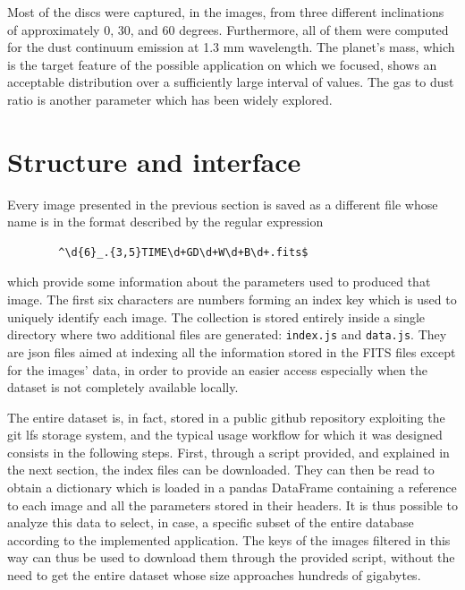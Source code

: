 \documentclass[a4paper,10pt]{report}
\begin{document}
Most of the discs were captured, in the images, from three different inclinations of approximately
0, 30, and 60 degrees. Furthermore, all of them were computed for the dust continuum emission 
at 1.3 mm wavelength.
The planet's mass, which is the target feature of the possible application on which we focused, shows an acceptable distribution over
a sufficiently large interval of values. The gas to dust ratio is another parameter which has been widely explored.

\section{Structure and interface}

Every image presented in the previous section is saved as a different file whose name is in the format 
described by the regular expression 
\begin{center}
    \begin{lstlisting}
        ^\d{6}_.{3,5}TIME\d+GD\d+W\d+B\d+.fits$
    \end{lstlisting}
\end{center}
which provide some information about the parameters used to produced that image. The first six 
characters are numbers forming an index key which is used to uniquely identify each image.
The collection is stored entirely inside a single directory where two additional files are generated: 
\lstinline{index.js} and \lstinline{data.js}. They are json files aimed at indexing all the information stored in the FITS 
files except for the images' data, in order to provide an easier access especially when the dataset is not completely
available locally.

The entire dataset is, in fact, stored in a public github repository exploiting
the git lfs storage system, and the typical usage workflow for which it was designed 
consists in the following steps. First, through a script provided, and explained in the next section,
the index files can be downloaded. They can then be read to obtain a dictionary which is loaded in a pandas DataFrame containing
a reference to each image and all the parameters stored in their headers. 
It is thus possible to analyze this data to select, in case, a specific subset of the entire database
according to the implemented application.
The keys of the images filtered in this way can thus be used to download them through the provided script, without the need
to get the entire dataset whose size approaches hundreds of gigabytes.
\end{document}
